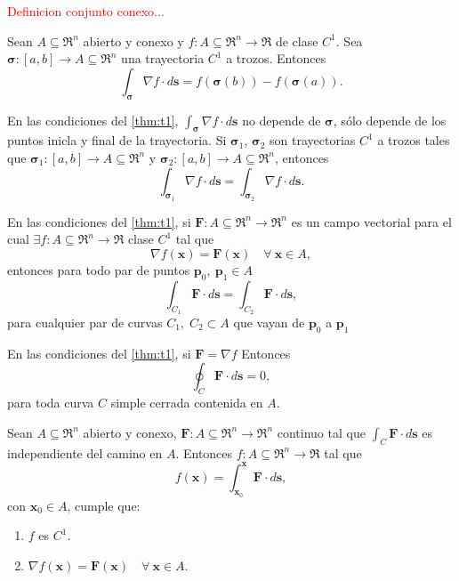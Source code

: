 \begin{definition}
    \textcolor{red}{Definicion conjunto conexo...}
\end{definition}

\begin{theorem} \label{thm:t1}
    Sean $A\subseteq\Re^n$ abierto y conexo y $f:A\subseteq\Re^n\to\Re$ de clase $C^1$. Sea $\boldsymbol{\sigma}:[a,b]\to A\subseteq\Re^n$ una trayectoria $C^1$ a trozos. Entonces
    \[
       \int_{\boldsymbol{\sigma}}\nabla f\cdot d\mathbf{s}=f(\boldsymbol{\sigma}(b))-f(\boldsymbol{\sigma}(a)).
    \]    
\end{theorem}

\begin{corollary}
    En las condiciones del \autoref{thm:t1}, $\int_{\boldsymbol{\sigma}}\nabla f\cdot d\mathbf{s}$ no depende de $\boldsymbol{\sigma}$, s\'olo depende de los puntos inicla y final de la trayectoria. Si $\boldsymbol{\sigma}_1$, $\boldsymbol{\sigma}_2$ son trayectorias $C^1$ a trozos tales que $\boldsymbol{\sigma}_1:[a,b]\to A\subseteq\Re^n$ y $\boldsymbol{\sigma}_2:[a,b]\to A\subseteq\Re^n$, entonces
    $$\int_{\boldsymbol{\sigma}_1}\nabla f\cdot d\mathbf{s}=\int_{\boldsymbol{\sigma}_2}\nabla f\cdot d\mathbf{s}.$$
\end{corollary}

\begin{corollary}
    En las condiciones del \autoref{thm:t1}, si $\mathbf{F}:A\subseteq\Re^n\to\Re^n$ es un campo vectorial para el cual $\exists f:A\subseteq\Re^n\to\Re$ clase $C^1$ tal que 
    $$\nabla f(\mathbf{x})=\mathbf{F}(\mathbf{x})\quad\forall\:\mathbf{x}\in A,$$
    entonces para todo par de puntos $\mathbf{p}_0,\:\mathbf{p}_1\in A$
    $$\int_{C_1}\mathbf{F}\cdot d\mathbf{s}=\int_{C_2}\mathbf{F}\cdot d\mathbf{s},$$
    para cualquier par de curvas $C_1,\;C_2\subset A$ que vayan de $\mathbf{p}_0$ a $\mathbf{p}_1$ 
\end{corollary}

\begin{corollary}
    En las condiciones del \autoref{thm:t1}, si $\mathbf{F}=\nabla f$ Entonces
    $$\oint_C\mathbf{F}\cdot d\mathbf{s}=0,$$
    para toda curva $C$ simple cerrada contenida en $A$.
\end{corollary}

\begin{theorem}
    Sean $A\subseteq\Re^n$ abierto y conexo, $\mathbf{F}:A\subseteq\Re^n\to\Re^n$ continuo tal que $\int_C \mathbf{F}\cdot d\mathbf{s}$ es independiente del camino en $A$. Entonces $f:A\subseteq\Re^n\to\Re$ tal que
    $$f(\mathbf{x})=\int_{\mathbf{x}_0}^{\mathbf{x}}\mathbf{F}\cdot d\mathbf{s},$$
    con $\mathbf{x}_0\in A$, cumple que: 
    \begin{enumerate}
        \item $f$ es $C^1$.
        \item $\nabla f(\mathbf{x})=\mathbf{F}(\mathbf{x})\quad\forall\:\mathbf{x}\in A.$
    \end{enumerate}
\end{theorem}

